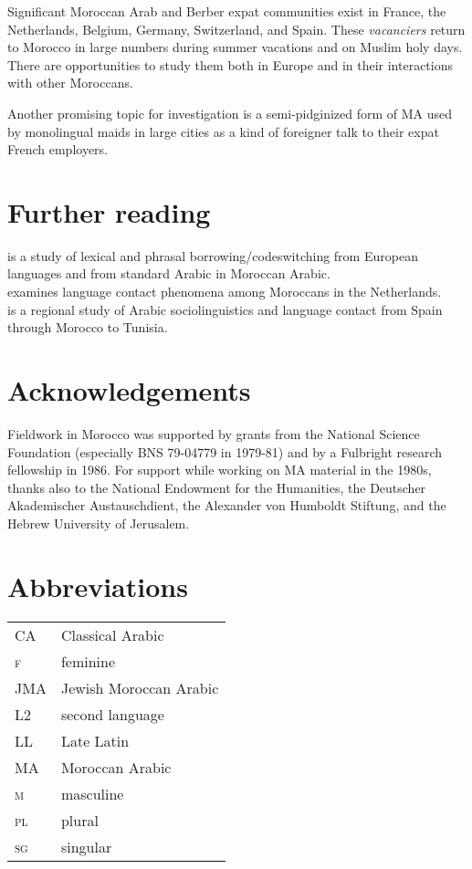\documentclass[output=paper]{langsci/langscibook}
\begin{document}
Significant Moroccan Arab and Berber expat communities exist in France, the Netherlands, Belgium, Germany, Switzerland, and Spain. These \textit{vacanciers} return to Morocco in large numbers during summer vacations and on Muslim holy days. There are opportunities to study them both in Europe \citep{Nortier1990} and in their interactions with other Moroccans. 

Another promising topic for investigation is a semi-pidginized form of MA used by monolingual maids in large cities as a kind of foreigner talk to their expat French employers.

\section*{Further reading}

\citet{Heath1989} is a study of lexical and phrasal borrowing/codeswitching from European languages and from standard Arabic in Moroccan Arabic.\\
\citet{Nortier1990} examines language contact phenomena among Moroccans in the Netherlands.\\
\citet{Sayahi2014} is a regional study of Arabic sociolinguistics and language contact from Spain through Morocco to Tunisia.

\section*{Acknowledgements}

Fieldwork in Morocco was supported by grants from the National Science Foundation (especially BNS 79-04779 in 1979-81) and by a Fulbright research fellowship in 1986. For support while working on MA material in the 1980s, thanks also to the National Endowment for the Humanities, the Deutscher Akademischer Austauschdient, the Alexander von Humboldt Stiftung, and the Hebrew University of Jerusalem.

\section*{Abbreviations}
\begin{tabularx}{.45\textwidth}{lQ}
CA          & Classical Arabic\\
\textsc{f}  & feminine\\
JMA         & Jewish Moroccan Arabic\\
L2          & second language \\
LL          & Late Latin\\
MA          & Moroccan Arabic\\
\textsc{m}  & masculine\\
\textsc{pl} & plural\\
\textsc{sg} & singular
\end{tabularx}


 
{\sloppy\printbibliography[heading=subbibliography,notkeyword=this]}
\end{document}
